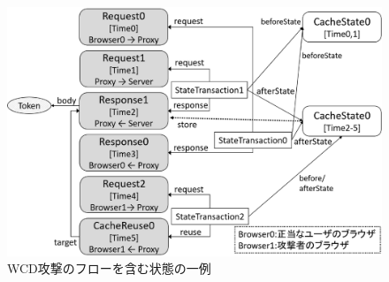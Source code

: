 \documentclass[12pt,a4paper]{jbook}
\begin{document}
\begin{figure}[htb]
\centering
\includegraphics[width=450pt]{./fig/WCD_alloy.eps}
\caption{WCD攻撃のフローを含む状態の一例}
\label{fig:WCD_alloy}
\end{figure}
\end{document}
